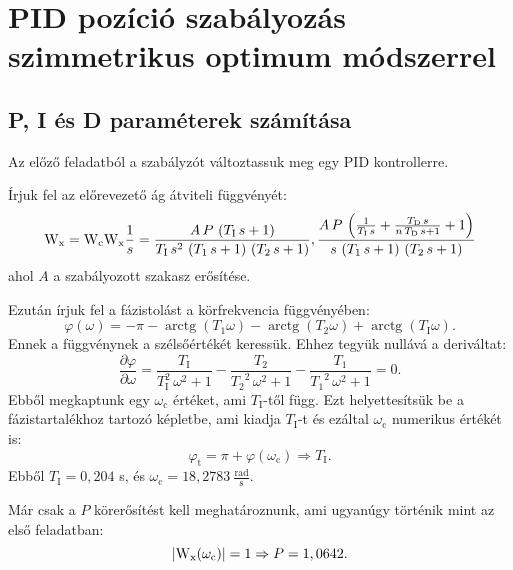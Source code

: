 \section{PID pozíció szabályozás szimmetrikus optimum módszerrel}

\subsection{P, I és D paraméterek számítása}

Az előző feladatból a szabályzót változtassuk meg egy PID kontrollerre.

Írjuk fel az előrevezető ág átviteli függvényét:
\begin{equation}
	\mathrm{W}_\text{x} = \mathrm{W}_\text{c}\mathrm{W}_\text{x}\frac{1}{s} = 
	\frac{A\, P\, \left(T_\text{I}\, s + 1\right)}{T_\text{I}\, s^2\, \left(T_1\, s + 1\right)\, \left(T_2\, s + 1\right)},
	\frac{A\, P\, \left(\frac{1}{T_\text{I}\, s} + \frac{T_\text{D}\, s}{n\,T_\text{D}\, s + 1} + 1\right)}{s\, \left(T_1\, s + 1\right)\, \left(T_2\, s + 1\right)}
\end{equation}
ahol $A$ a szabályozott szakasz erősítése.

Ezután írjuk fel a fázistolást a körfrekvencia függvényében:
\begin{equation}
	\varphi(\omega) = -\pi - \operatorname{arctg}(T_1\omega) - \operatorname{arctg}(T_2\omega) + \operatorname{arctg}(T_\text{I}\omega).
\end{equation}
Ennek a függvénynek a szélsőértékét keressük. Ehhez tegyük nullává a deriváltat:
\begin{equation}
	\frac{\partial\varphi}{\partial\omega} = 
	\frac{T_\text{I}}{T_\text{I}^2\, \omega^2 + 1} - \frac{T_2}{{T_2}^2\, \omega^2 + 1} - \frac{T_1}{{T_1}^2\, \omega^2 + 1} = 0.
\end{equation}
Ebből megkaptunk egy $\omega_\text{c}$ értéket, ami $T_\text{I}$-től függ.
Ezt helyettesítsük be a fázistartalékhoz tartozó képletbe, ami kiadja $T_\text{I}$-t és
ezáltal $\omega_\text{c}$ numerikus értékét is:
\begin{equation}
	\varphi_\text{t} = \pi + \varphi(\omega_\text{c}) \Rightarrow T_\text{I}.
\end{equation}
Ebből $T_\text{I} = 0,204$ s, és $\omega_\text{c} = 18,2783~\frac{\text{rad}}{\text{s}}$.

Már csak a $P$ körerősítést kell meghatároznunk, ami ugyanúgy történik mint az első feladatban:
\begin{equation}
	\left\lvert \mathrm{W}_\text{x}(\omega_\text{c}) \right\rvert = 1 \Rightarrow P = 1,0642.
\end{equation}

